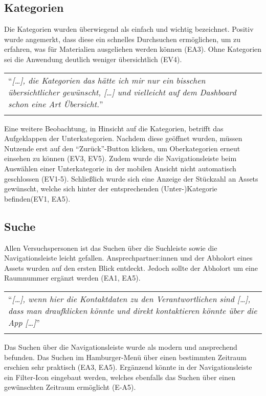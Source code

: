 \subsection{Kategorien}
Die Kategorien wurden überwiegend als einfach und wichtig bezeichnet. Positiv wurde angemerkt, dass
diese ein schnelles Durchsuchen ermöglichen, um zu erfahren, was für Materialien ausgeliehen werden
können (EA3). Ohne Kategorien sei die Anwendung deutlich weniger übersichtlich (EV4).

\begin{longtable}{p{}} \arrayrulecolor{maincolor}\hline
  \enquote{\textit{[\dots], die Kategorien das hätte ich mir nur ein bisschen
      übersichtlicher gewünscht, [\dots] und vielleicht auf dem Dashboard schon eine
  Art Übersicht.}} \\
  \arrayrulecolor{maincolor}\hline
\end{longtable}

Eine weitere Beobachtung, in Hinsicht auf die Kategorien, betrifft das Aufgeklappen der
Unterkategorien. Nachdem diese geöffnet wurden, müssen Nutzende erst auf den \enquote{Zurück}-Button
klicken, um Oberkategorien erneut einsehen zu können (EV3, EV5). Zudem wurde die Navigationsleiste
beim Auswählen einer Unterkategorie in der mobilen Ansicht nicht automatisch geschlossen (EV1-5).
Schließlich wurde sich eine Anzeige der Stückzahl an Assets gewünscht, welche sich hinter der
entsprechenden (Unter-)Kategorie befinden(EV1, EA5).

\subsection{Suche}
Allen Versuchspersonen ist das Suchen über die Suchleiste sowie die Navigationsleiste leicht
gefallen. Ansprechpartner:innen und der Abholort eines Assets wurden auf den ersten Blick entdeckt.
Jedoch sollte der Abholort um eine Raumnummer ergänzt werden (EA1, EA5).
\begin{longtable}{p{}} \arrayrulecolor{maincolor}\hline
  \enquote{\textit{[\dots], wenn hier die Kontaktdaten zu den Verantwortlichen
      sind [\dots], dass man draufklicken könnte und direkt kontaktieren könnte
  über die App [\dots]}} \\
  \arrayrulecolor{maincolor}\hline
\end{longtable}

Das Suchen über die Navigationsleiste wurde als modern und ansprechend befunden. Das Suchen im
Hamburger-Menü über einen bestimmten Zeitraum erschien sehr praktisch (EA3, EA5). Ergänzend könnte
in der Navigationsleiste ein Filter-Icon eingebaut werden, welches ebenfalls das Suchen über einen
gewünschten Zeitraum ermöglicht (E-A5).


